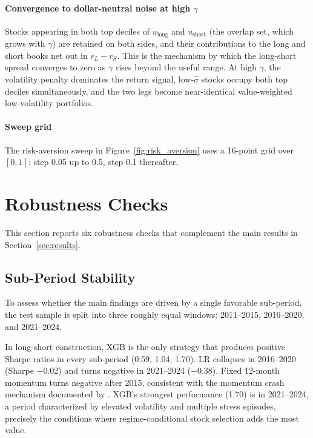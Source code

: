 \paragraph{Convergence to dollar-neutral noise at high $\gamma$} Stocks appearing in both top deciles of $u_{\text{long}}$ and $u_{\text{short}}$ (the overlap set, which grows with $\gamma$) are retained on both sides, and their contributions to the long and short books net out in $r_L - r_S$. This is the mechanism by which the long-short spread converges to zero as $\gamma$ rises beyond the useful range. At high $\gamma$, the volatility penalty dominates the return signal, low-$\hat\sigma$ stocks occupy both top deciles simultaneously, and the two legs become near-identical value-weighted low-volatility portfolios.

\paragraph{Sweep grid} The risk-aversion sweep in Figure~\ref{fig:risk_aversion} uses a 16-point grid over $[0, 1]$: step 0.05 up to 0.5, step 0.1 thereafter.

\section{Robustness Checks}\label{app:robustness}

This section reports six robustness checks that complement the main results in Section~\ref{sec:results}.

\subsection{Sub-Period Stability}\label{app:subperiod}

To assess whether the main findings are driven by a single favorable sub-period, the test sample is split into three roughly equal windows: 2011--2015, 2016--2020, and 2021--2024.



In long-short construction, XGB is the only strategy that produces positive Sharpe ratios in every sub-period (0.59, 1.04, 1.70). LR collapses in 2016--2020 (Sharpe $-$0.02) and turns negative in 2021--2024 ($-$0.38). Fixed 12-month momentum turns negative after 2015, consistent with the momentum crash mechanism documented by \citet{DanielMoskowitz2016}. XGB's strongest performance (1.70) is in 2021--2024, a period characterized by elevated volatility and multiple stress episodes, precisely the conditions where regime-conditional stock selection adds the most value.

